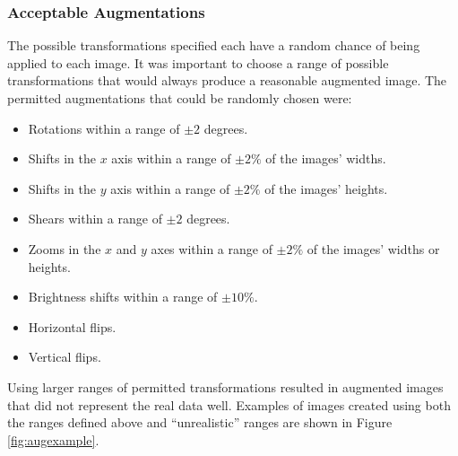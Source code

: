 \subsubsection{Acceptable Augmentations}

The possible transformations specified each have a random chance of being applied to each image. It was important to choose a range of possible transformations that would always produce a reasonable augmented image. The permitted augmentations that could be randomly chosen were:

\begin{itemize}
    \item Rotations within a range of $\pm 2$ degrees.
    \item Shifts in the $x$ axis within a range of $\pm 2\%$ of the images' widths.
    \item Shifts in the $y$ axis within a range of $\pm 2\%$ of the images' heights.
    \item Shears within a range of $\pm 2$ degrees.
    \item Zooms in the $x$ and $y$ axes within a range of $\pm 2\%$ of the images' widths or heights.
    \item Brightness shifts within a range of $\pm 10\%$.
    \item Horizontal flips.
    \item Vertical flips.
\end{itemize}

Using larger ranges of permitted transformations resulted in augmented images that did not represent the real data well. Examples of images created using both the ranges defined above and ``unrealistic'' ranges are shown in Figure \ref{fig:augexample}.

